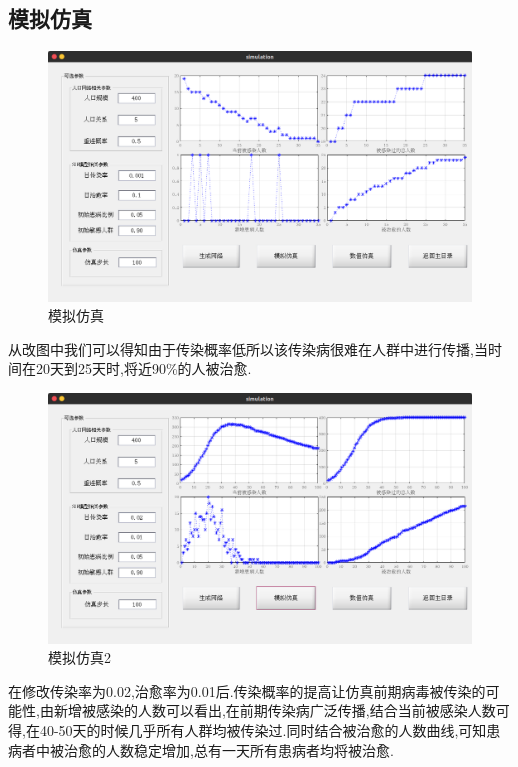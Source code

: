 \documentclass[supercite]{HustGraduPaper}
\begin{document}
	\subsection{模拟仿真}
	\begin{figure}[H]
		\centering
		\includegraphics[scale=0.35]{Figures/moni.png}
		\caption{模拟仿真}
	\end{figure} 
	从改图中我们可以得知由于传染概率低所以该传染病很难在人群中进行传播,当时间在20天到25天时,将近90\%的人被治愈.

	\begin{figure}[H]
		\centering
		\includegraphics[scale=0.35]{Figures/moni2.png}
		\caption{模拟仿真2}
	\end{figure} 
	在修改传染率为0.02,治愈率为0.01后.传染概率的提高让仿真前期病毒被传染的可能性,由新增被感染的人数可以看出,在前期传染病广泛传播,结合当前被感染人数可得,在40-50天的时候几乎所有人群均被传染过.同时结合被治愈的人数曲线,可知患病者中被治愈的人数稳定增加,总有一天所有患病者均将被治愈.
\end{document}
